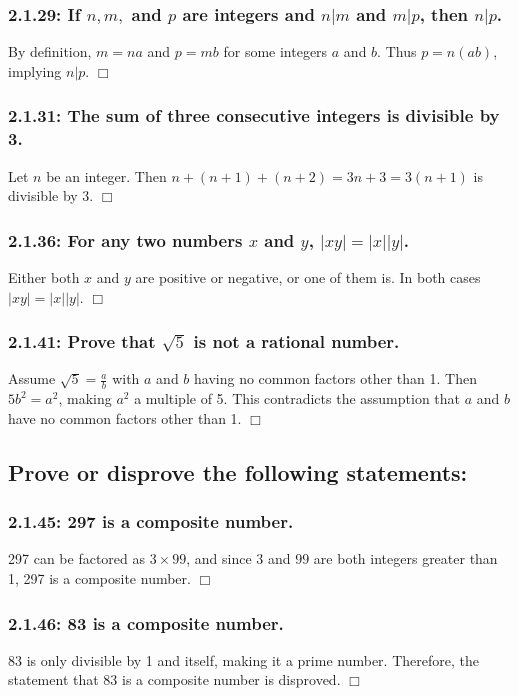 \documentclass[12pt]{article}
\begin{document}
\subsubsection*{2.1.29: If \( n, m, \) and \( p \) are integers and \( n|m \) and \( m|p \), then \( n|p \).}
By definition, \(m = na\) and \(p = mb\) for some integers \(a\) and \(b\). Thus \(p = n(ab)\), implying \(n|p\). \(\Box\)

\subsubsection*{2.1.31: The sum of three consecutive integers is divisible by 3.}
Let \(n\) be an integer. Then \(n + (n + 1) + (n + 2) = 3n + 3 = 3(n + 1)\) is divisible by 3. \(\Box\)

\subsubsection*{2.1.36: For any two numbers \( x \) and \( y \), \( |xy| = |x||y| \).}
Either both \(x\) and \(y\) are positive or negative, or one of them is. In both cases \( |xy| = |x||y| \). \(\Box\)

\subsubsection*{2.1.41: Prove that \( \sqrt{5} \) is not a rational number.}
Assume \(\sqrt{5} = \frac{a}{b}\) with \(a\) and \(b\) having no common factors other than 1. Then \(5b^2 = a^2\), making \(a^2\) a multiple of 5. This contradicts the assumption that \(a\) and \(b\) have no common factors other than 1. \(\Box\)



\newpage
\subsection*{Prove or disprove the following statements:}

\subsubsection*{2.1.45: 297 is a composite number.}
297 can be factored as \(3 \times 99\), and since \(3\) and \(99\) are both integers greater than 1, 297 is a composite number. \(\Box\)

\subsubsection*{2.1.46: 83 is a composite number.}
83 is only divisible by 1 and itself, making it a prime number. Therefore, the statement that 83 is a composite number is disproved. \(\Box\)
\end{document}
